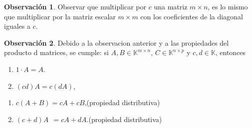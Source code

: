 \documentclass{article}
\theoremstyle{definition}
\theoremstyle{definition}
\newtheorem*{obs}{Observación}
\theoremstyle{remark}
\begin{document}
\begin{obs}
  Observar que multiplicar por $c$ una matriz $m \times n$, es lo mismo que multiplicar por la matriz escalar $m \times m$ con los coeficientes de la diagonal iguales a $c$.
\end{obs}
\begin{obs}
  Debido a la observacion anterior y a las propiedades del producto d matrices, se cumple: si $A,B \in \mathbb{K}^{m \times n}$, $C \in \mathbb{K}^{n \times p}$ y $c,d \in \mathbb{K}$, entonces \begin{enumerate}[label=\textcolor{azulp2}{P\arabic*.}]
    \item $1\cdot A=A$. 
    \item $(cd)A=c(dA)$, 
 \end{enumerate}
\begin{enumerate}[label=\textcolor{azulp2}{D\arabic*.}]
  \item $c(A+B)=cA+cB$,\quad (propiedad distributiva)
\item $(c+d)A\phantom{,}=cA+dA$.\quad (propiedad distributiva) \end{enumerate}
\end{obs}\pagebreak 
\end{document}
